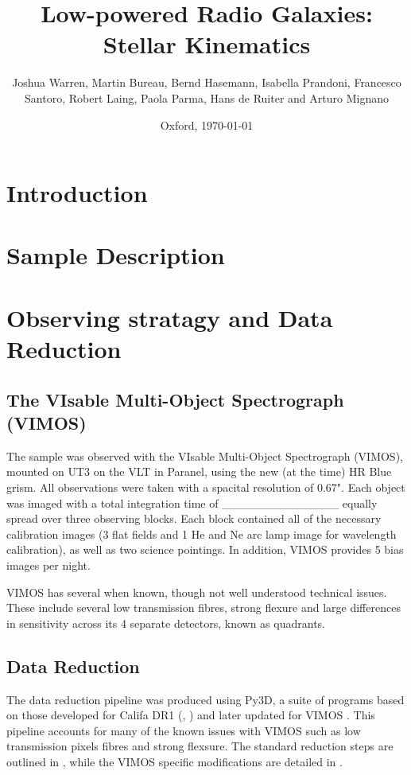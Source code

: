 \documentclass[a4paper,11pt]{article}
\begin{document}
\title{Low-powered Radio Galaxies: Stellar Kinematics}
\author{Joshua Warren, Martin Bureau, Bernd Hasemann, Isabella Prandoni, Francesco Santoro, Robert Laing, Paola Parma, Hans de Ruiter and Arturo Mignano}
\date{Oxford, \today}


\maketitle


\section{Introduction}
	\label{sec:intro}

\section{Sample Description}
	\label{sec:samp}
	

\section{Observing stratagy and Data Reduction}
	\label{sec:obs}
	\subsection{The VIsable Multi-Object Spectrograph (VIMOS)}
		\label{subsec:VIMOS}
		The sample was observed with the VIsable Multi-Object Spectrograph (VIMOS), mounted on UT3 on the VLT in Paranel, using the new (at the time) HR Blue grism. All observations were taken with a spacital resolution of 0.67". Each object was imaged with a total integration time of \_\_\_\_\_\_\_\_\_\_\_\_\_\_ equally spread over three observing blocks. Each block contained all of the necessary calibration images (3 flat fields and 1 He and Ne arc lamp image for wavelength calibration), as well as two science pointings. In addition, VIMOS provides 5 bias images per night. 

		VIMOS has several when known, though not well understood technical issues. These include several low transmission fibres, strong flexure and large differences in sensitivity across its 4 separate detectors, known as quadrants.

	\subsection{Data Reduction}
		\label{subsec:reduct}
		The data reduction pipeline was produced using Py3D, a suite of programs based on those developed for Califa DR1 (\cite{Sanchez2011}, \cite{Husemann2013}) and later updated for VIMOS \cite{Husemann2014}. This pipeline accounts for many of the known issues with VIMOS such as low transmission pixels fibres and strong flexsure. The standard reduction steps are outlined in \cite{Sanchez2011}, while the VIMOS specific modifications are detailed in \cite{Husemann2014}. 
\end{document}

